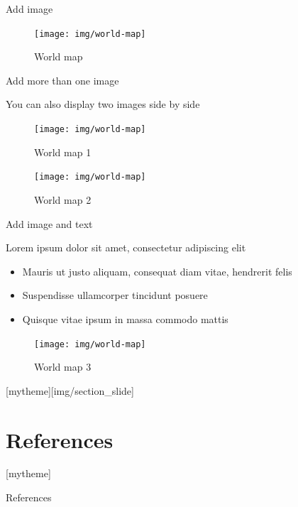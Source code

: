 \documentclass[aspectratio=169]{beamer}
\newcommand{\sectionpic}[2]{
	\setbeamertemplate{section page}[mytheme][#2]
	\section{#1}
	\setbeamertemplate{section page}[mytheme]
}
\begin{document}
\begin{frame}{Add image}

	\begin{figure}
		\centering
		\texttt{[image: img/world-map]}
		\caption{World map}
		\label{fig:world-map}
	\end{figure}

\end{frame}

\begin{frame}{Add more than one image}

You can also display two images side by side

	\begin{multicols}{2}

		\begin{figure}
			\centering
			\texttt{[image: img/world-map]}
			\caption{World map 1}
			\label{fig:world-map1}
		\end{figure}
		\begin{figure}
			\centering
			\texttt{[image: img/world-map]}
			\caption{World map 2}
			\label{fig:world-map2}
		\end{figure}

	\end{multicols}

\end{frame}

\begin{frame}{Add image and text}

Lorem ipsum dolor sit amet, consectetur adipiscing elit

	\begin{multicols}{2}

		\begin{itemize}
			\item Mauris ut justo aliquam, consequat diam vitae, hendrerit felis
			\item Suspendisse ullamcorper tincidunt posuere
			\item Quisque vitae ipsum in massa commodo mattis
		\end{itemize}
		\begin{figure}
			\centering
			\texttt{[image: img/world-map]}
			\caption{World map 3}
			\label{fig:world-map3}
		\end{figure}

	\end{multicols}

\end{frame}

\sectionpic{References}{img/section_slide}

\begin{frame}{References}
	\begin{tiny}\end{tiny}
\end{frame}
\end{document}
